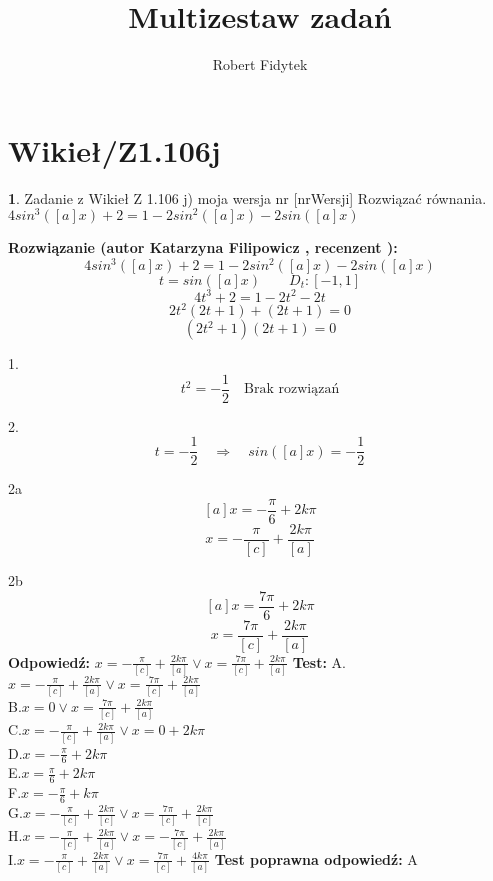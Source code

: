 \documentclass[12pt, a4paper]{article}
\title{Multizestaw zadań}
\author{Robert Fidytek}
\date{}
\theoremstyle{definition} %
\newtheorem{zad}{}
\newcommand{\kategoria}[1]{\section{#1}} %
\newcommand{\zadStart}[1]{\begin{zad}#1\newline} %
\newcommand{\zadStop}{\end{zad}}   %
\newcommand{\rozwStart}[2]{\noindent \textbf{Rozwiązanie (autor #1 , recenzent #2): }\newline} %
\newcommand{\rozwStop}{\newline}                                            %
\newcommand{\odpStart}{\noindent \textbf{Odpowiedź:}\newline}    %
\newcommand{\odpStop}{\newline}                                             %
\newcommand{\testStart}{\noindent \textbf{Test:}\newline} %
\newcommand{\testStop}{\newline} %
\newcommand{\kluczStart}{\noindent \textbf{Test poprawna odpowiedź:}\newline} %
\newcommand{\kluczStop}{\newline} %
\begin{document}
\maketitle


\kategoria{Wikieł/Z1.106j}
\zadStart{Zadanie z Wikieł Z 1.106 j) moja wersja nr [nrWersji]}
Rozwiązać równania.\\
 $4sin^3([a]x)+2=1-2sin^2([a]x)-2sin([a]x)$
\zadStop
\rozwStart{Katarzyna Filipowicz}{}
$$4sin^3([a]x)+2=1-2sin^2([a]x)-2sin([a]x)$$
$$
t=sin([a]x) \qquad D_t:[-1,1]
$$ $$
4t^3+2=1-2t^2-2t
$$ $$
2t^2(2t+1)+(2t+1)=0
$$ $$
(2t^2+1)(2t+1)=0
$$

1. $$
t^2=-\frac{1}{2} \quad \text{Brak rozwiązań}
$$ 

2. $$
t=-\frac{1}{2} \quad \Rightarrow \quad sin([a]x)=-\frac{1}{2}
$$ 

2a$$
[a]x=-\frac{\pi}{6}+2k\pi
$$ $$
x=-\frac{\pi}{[c]}+\frac{2k\pi}{[a]}
$$

2b$$
[a]x=\frac{7\pi}{6}+2k\pi
$$ $$
x=\frac{7\pi}{[c]}+\frac{2k\pi}{[a]}
$$
\rozwStop
\odpStart
$x=-\frac{\pi}{[c]}+\frac{2k\pi}{[a]} \vee x=\frac{7\pi}{[c]}+\frac{2k\pi}{[a]}$
\odpStop
\testStart
A.$x=-\frac{\pi}{[c]}+\frac{2k\pi}{[a]} \vee x=\frac{7\pi}{[c]}+\frac{2k\pi}{[a]}$\\
B.$x=0 \vee x=\frac{7\pi}{[c]}+\frac{2k\pi}{[a]}$\\
C.$x=-\frac{\pi}{[c]}+\frac{2k\pi}{[a]} \vee x=0+2k\pi$\\
D.$x=-\frac{\pi}{6}+2k\pi$\\
E.$x=\frac{\pi}{6}+2k\pi$\\
F.$x=-\frac{\pi}{6}+k\pi$\\
G.$x=-\frac{\pi}{[c]}+\frac{2k\pi}{[c]} \vee x=\frac{7\pi}{[c]}+\frac{2k\pi}{[c]}$\\
H.$x=-\frac{\pi}{[c]}+\frac{2k\pi}{[a]} \vee x=-\frac{7\pi}{[c]}+\frac{2k\pi}{[a]}$\\
I.$x=-\frac{\pi}{[c]}+\frac{2k\pi}{[a]} \vee x=\frac{7\pi}{[c]}+\frac{4k\pi}{[a]}$
\testStop
\kluczStart
A
\kluczStop
\end{document}
